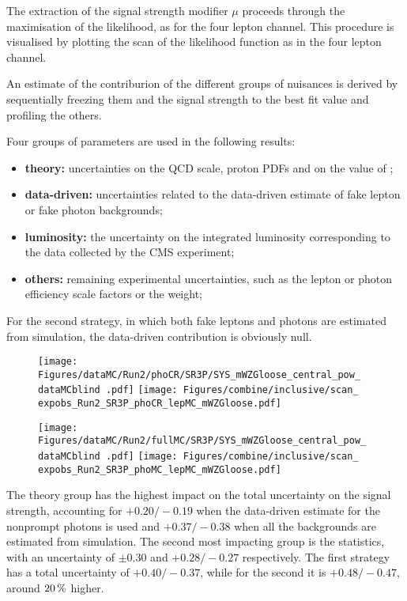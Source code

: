 The extraction of the signal strength modifier $\mu$ proceeds through the maximisation of the likelihood,
as for the four lepton channel.
This procedure is visualised by plotting the scan of the likelihood function as in the four lepton channel.

An estimate of the contriburion of the different groups of nuisances is derived
by sequentially freezing them and the signal strength to the best fit value
and profiling the others.

Four groups of parameters are used in the following results:
\begin{itemize}
\item \textbf{theory:} uncertainties on the QCD scale, proton PDFs and on the value of \alpS;
\item \textbf{data-driven:} uncertainties related to the data-driven estimate of fake lepton or fake photon backgrounds;
\item \textbf{luminosity:} the uncertainty on the integrated luminosity corresponding to the data collected by the CMS experiment;
\item \textbf{others:} remaining experimental uncertainties, such as the lepton or photon efficiency scale factors or the \pileup weight;
\end{itemize}

For the second strategy, in which both fake leptons and photons are estimated from simulation,
the data-driven contribution is obviously null.

\begin{figure}
  \centering
  \texttt{[image: Figures/dataMC/Run2/phoCR/SR3P/SYS\_mWZGloose\_central\_pow\_\\dataMCblind .pdf]}
  \hfill
  \texttt{[image: Figures/combine/inclusive/scan\_\\expobs\_Run2\_SR3P\_phoCR\_lepMC\_mWZGloose.pdf]}
  \caption{}
  \label{fig:scan_Run2_SR3P_phoCR_lepMC_mWZGloose}
\end{figure}

\begin{figure}
  \centering
  \texttt{[image: Figures/dataMC/Run2/fullMC/SR3P/SYS\_mWZGloose\_central\_pow\_\\dataMCblind .pdf]}
  \hfill
  \texttt{[image: Figures/combine/inclusive/scan\_\\expobs\_Run2\_SR3P\_phoMC\_lepMC\_mWZGloose.pdf]}
  \caption{}
  \label{fig:scan_Run2_SR4P_phoMC_lepMC_mWZGloose}
\end{figure}

The theory group has the highest impact on the total uncertainty on the signal strength,
accounting for $+0.20/-0.19$ when the data-driven estimate for the nonprompt photons is used
and $+0.37/-0.38$ when all the backgrounds are estimated from simulation.
The second most impacting group is the statistics, with an uncertainty of
$\pm 0.30$ and $+0.28/-0.27$ respectively.
The first strategy has a total uncertainty of $+0.40/-0.37$,
while for the second it is $+0.48/-0.47$,
around $20\usep\%$ higher.
